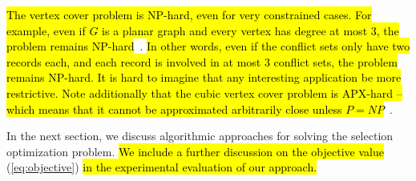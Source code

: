 
\hl{The vertex cover problem is NP-hard, even for very constrained cases. For example, even if $G$ is a planar graph and every vertex has degree at most 3, the problem remains NP-hard}~\cite{garey1977rectilinear}. \hl{In other words, even if the conflict sets only have two records each, and each record is involved in at most 3 conflict sets, the problem remains NP-hard. It is hard to imagine that any interesting application be more restrictive. Note additionally that the cubic vertex cover problem is APX-hard -- which means that it cannot be approximated arbitrarily close unless $P=NP$}~\cite{alimonti2000some}. %

In the next section, we discuss algorithmic approaches for solving the selection optimization problem. \hl{We include a further discussion on the objective value} (\ref{eq:objective})\hl{ in the experimental evaluation of our approach.}